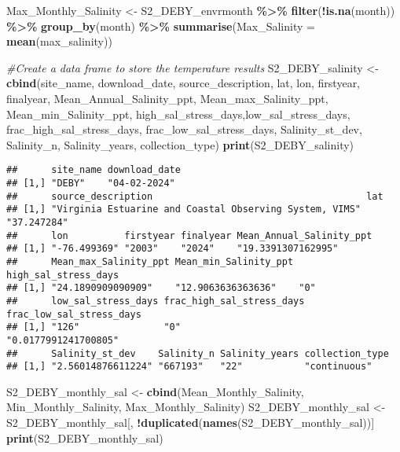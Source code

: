 \documentclass[
]{article}
\newenvironment{Shaded}{\begin{snugshade}}{\end{snugshade}}
\newcommand{\AttributeTok}[1]{\textcolor[rgb]{0.13,0.29,0.53}{#1}}
\newcommand{\CommentTok}[1]{\textcolor[rgb]{0.56,0.35,0.01}{\textit{#1}}}
\newcommand{\FunctionTok}[1]{\textcolor[rgb]{0.13,0.29,0.53}{\textbf{#1}}}
\newcommand{\NormalTok}[1]{#1}
\newcommand{\OtherTok}[1]{\textcolor[rgb]{0.56,0.35,0.01}{#1}}
\newcommand{\SpecialCharTok}[1]{\textcolor[rgb]{0.81,0.36,0.00}{\textbf{#1}}}
\begin{document}
\begin{Shaded}
\begin{Highlighting}[]
\NormalTok{Max\_Monthly\_Salinity }\OtherTok{\textless{}{-}}\NormalTok{ S2\_DEBY\_envrmonth }\SpecialCharTok{\%\textgreater{}\%}
  \FunctionTok{filter}\NormalTok{(}\SpecialCharTok{!}\FunctionTok{is.na}\NormalTok{(month)) }\SpecialCharTok{\%\textgreater{}\%}
  \FunctionTok{group\_by}\NormalTok{(month) }\SpecialCharTok{\%\textgreater{}\%}
  \FunctionTok{summarise}\NormalTok{(}\AttributeTok{Max\_Salinity =} \FunctionTok{mean}\NormalTok{(max\_salinity))}

\CommentTok{\#Create a data frame to store the temperature results}
\NormalTok{S2\_DEBY\_salinity }\OtherTok{\textless{}{-}} \FunctionTok{cbind}\NormalTok{(site\_name, download\_date, source\_description, lat, lon, firstyear, finalyear, Mean\_Annual\_Salinity\_ppt, Mean\_max\_Salinity\_ppt, Mean\_min\_Salinity\_ppt, high\_sal\_stress\_days,low\_sal\_stress\_days, frac\_high\_sal\_stress\_days, frac\_low\_sal\_stress\_days, Salinity\_st\_dev, Salinity\_n, Salinity\_years, collection\_type)}
\FunctionTok{print}\NormalTok{(S2\_DEBY\_salinity)}
\end{Highlighting}
\end{Shaded}

\begin{verbatim}
##      site_name download_date
## [1,] "DEBY"    "04-02-2024" 
##      source_description                                      lat        
## [1,] "Virginia Estuarine and Coastal Observing System, VIMS" "37.247284"
##      lon          firstyear finalyear Mean_Annual_Salinity_ppt
## [1,] "-76.499369" "2003"    "2024"    "19.3391307162995"      
##      Mean_max_Salinity_ppt Mean_min_Salinity_ppt high_sal_stress_days
## [1,] "24.1890909090909"    "12.9063636363636"    "0"                 
##      low_sal_stress_days frac_high_sal_stress_days frac_low_sal_stress_days
## [1,] "126"               "0"                       "0.0177991241700805"    
##      Salinity_st_dev    Salinity_n Salinity_years collection_type
## [1,] "2.56014876611224" "667193"   "22"           "continuous"
\end{verbatim}

\begin{Shaded}
\begin{Highlighting}[]
\NormalTok{S2\_DEBY\_monthly\_sal }\OtherTok{\textless{}{-}} \FunctionTok{cbind}\NormalTok{(Mean\_Monthly\_Salinity, Min\_Monthly\_Salinity, Max\_Monthly\_Salinity)}
\NormalTok{S2\_DEBY\_monthly\_sal }\OtherTok{\textless{}{-}}\NormalTok{ S2\_DEBY\_monthly\_sal[, }\SpecialCharTok{!}\FunctionTok{duplicated}\NormalTok{(}\FunctionTok{names}\NormalTok{(S2\_DEBY\_monthly\_sal))]}
\FunctionTok{print}\NormalTok{(S2\_DEBY\_monthly\_sal)}
\end{Highlighting}
\end{Shaded}
\end{document}
